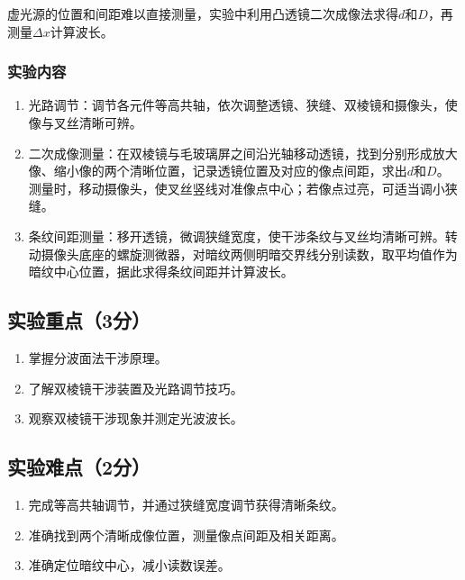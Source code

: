 \documentclass[10pt,a4paper]{ctexart} %
\begin{document}
    虚光源的位置和间距难以直接测量，实验中利用凸透镜二次成像法求得\(d\)和\(D\)，再测量\(\Delta x\)计算波长。

    \subsubsection{实验内容}
    \begin{enumerate}
      \item 光路调节：调节各元件等高共轴，依次调整透镜、狭缝、双棱镜和摄像头，使像与叉丝清晰可辨。
      \item 二次成像测量：在双棱镜与毛玻璃屏之间沿光轴移动透镜，找到分别形成放大像、缩小像的两个清晰位置，记录透镜位置及对应的像点间距，求出\(d\)和\(D\)。测量时，移动摄像头，使叉丝竖线对准像点中心；若像点过亮，可适当调小狭缝。
      \item 条纹间距测量：移开透镜，微调狭缝宽度，使干涉条纹与叉丝均清晰可辨。转动摄像头底座的螺旋测微器，对暗纹两侧明暗交界线分别读数，取平均值作为暗纹中心位置，据此求得条纹间距并计算波长。
    \end{enumerate}

  \subsection{实验重点（3分）}
  \begin{enumerate}
    \item 掌握分波面法干涉原理。
    \item 了解双棱镜干涉装置及光路调节技巧。
    \item 观察双棱镜干涉现象并测定光波波长。
  \end{enumerate}

  \subsection{实验难点（2分）}
  \begin{enumerate}
    \item 完成等高共轴调节，并通过狭缝宽度调节获得清晰条纹。
    \item 准确找到两个清晰成像位置，测量像点间距及相关距离。
    \item 准确定位暗纹中心，减小读数误差。
  \end{enumerate}
\end{document}
